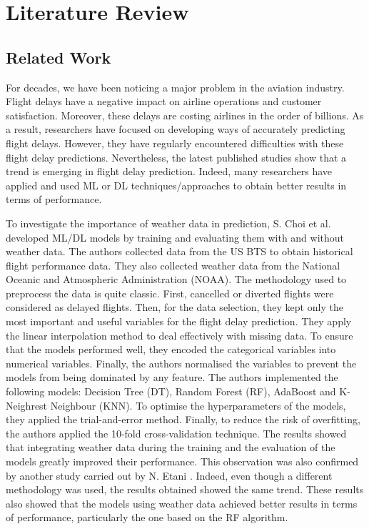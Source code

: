 \documentclass[12pt,oneside]{book} %
\begin{document}
\chapter{Literature Review}

\section{Related Work}
\label{related_work}
\noindent For decades, we have been noticing a major problem in the aviation industry. Flight delays have a negative impact on airline operations and customer satisfaction. Moreover, these delays are costing airlines in the order of billions. As a result, researchers have focused on developing ways of accurately predicting flight delays. However, they have regularly encountered difficulties with these flight delay predictions. Nevertheless, the latest published studies show that a trend is emerging in flight delay prediction. Indeed, many researchers have applied and used ML or DL techniques/approaches to obtain better results in terms of performance.

\noindent To investigate the importance of weather data in prediction, S. Choi et al. \cite{choi} developed ML/DL models by training and evaluating them with and without weather data. The authors collected data from the US BTS to obtain historical flight performance data. They also collected weather data from the National Oceanic and Atmospheric Administration (NOAA). The methodology used to preprocess the data is quite classic. First, cancelled or diverted flights were considered as delayed flights. Then, for the data selection, they kept only the most important and useful variables for the flight delay prediction. They apply the linear interpolation method to deal effectively with missing data. To ensure that the models performed well, they encoded the categorical variables into numerical variables. Finally, the authors normalised the variables to prevent the models from being dominated by any feature. The authors implemented the following models: Decision Tree (DT), Random Forest (RF), AdaBoost and K-Neighrest Neighbour (KNN). To optimise the hyperparameters of the models, they applied the trial-and-error method. Finally, to reduce the risk of overfitting, the authors applied the 10-fold cross-validation technique. The results showed that integrating weather data during the training and the evaluation of the models greatly improved their performance. This observation was also confirmed by another study carried out by N. Etani \cite{Etani}. Indeed, even though a different methodology was used, the results obtained showed the same trend. These results also showed that the models using weather data achieved better results in terms of performance, particularly the one based on the RF algorithm.
\end{document}
